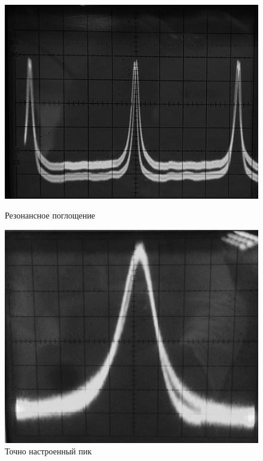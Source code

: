 \documentclass[a4paper,12pt]{article}
\begin{document}
\begin{figure}[h!]
    \begin{center}
        \begin{minipage}{0.49\linewidth}
            \includegraphics[width=\linewidth]{oscilloscope.jpg}
            \caption{Резонансное поглощение}
        \end{minipage}
        \hfill
        \begin{minipage}{0.49\linewidth}
            \includegraphics[width=\linewidth]{second.jpg}
            \caption{Точно настроенный пик}
        \end{minipage}
    \end{center}
\end{figure}    
\end{document}
